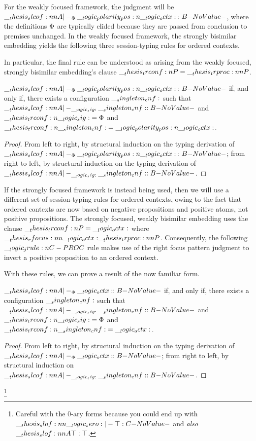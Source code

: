 For the weakly focused framework, the judgment will be $\slcof{A |-_{\orsig} \p{\octx} : B}$, where the definitions $\Phi$ are typically elided because they are passed from conclusion to premises unchanged.
In the weakly focused framework, the strongly bisimilar embedding yields the following three session-typing rules for ordered contexts.
In particular, the final rule can be understood as arising from the weakly focused, strongly bisimilar embedding's clause $\trconf{P} = \trproc{P}$.

\begin{theorem}
  $\slcof{A |-_{\orsig} \p{\octx} : B}$ if, and only if, there exists a configuration $\__singleton_cnf:$ such that $\slcof{A |-_{\sig} \cnf : B}$ and $\__thesis_trconf:n {\__logic_sig:} = \Phi$ and $\__thesis_trconf:n {\__singleton_cnf:} = \__logic_polarity_pos:n {\__logic_octx:}$.
\end{theorem}
\begin{proof}
  From left to right, by structural induction on the typing derivation of $\slcof{A |-_{\orsig} \p{\octx} : B}$;
  from right to left, by structural induction on the typing derivation of $\slcof{A |-_{\sig} \cnf : B}$.
\end{proof}

If the strongly focused framework is instead being used, then we will use a different set of session-typing rules for ordered contexts, owing to the fact that ordered contexts are now based on negative propositions and positive atoms, not positive propositions.
The strongly focused, weakly bisimilar embedding uses the clause $\__thesis_trconf:n {P} = \__logic_octx:$ where $\rfocus{\octx}{\trproc{P}}$.
Consequently, the following $\__logic_jrule:n {C-PROC}$ rule makes use of the right focus pattern judgment to invert a positive proposition to an ordered context.
With these rules, we can prove a result of the now familiar form.
\begin{theorem}
  $\slcof{A |-_{\orsig} \octx : B}$ if, and only if, there exists a configuration $\__singleton_cnf:$ such that $\slcof{A |-_{\sig} \cnf : B}$ and $\__thesis_trconf:n {\__logic_sig:} = \Phi$ and $\__thesis_trconf:n {\__singleton_cnf:} = \__logic_octx:$.
\end{theorem}
\begin{proof}
  From left to right, by structural induction on the typing derivation of $\slcof{A |-_{\orsig} \octx : B}$;
  from right to left, by structural induction on $\slcof{A |-_{\sig} \cnf : B}$.
\end{proof}




\footnote{Careful with the 0-ary forms because you could end up with $\slof{\zero |- \top : C}$ and \emph{also} $\slof{A |- \top : \top}$.}


